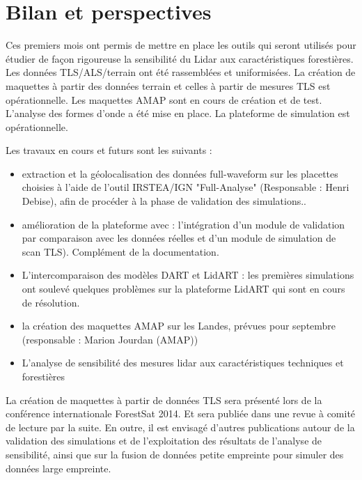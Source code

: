 \documentclass[a4paper,11pt]{article}
\begin{document}
\newpage

\section{Bilan et perspectives}
Ces premiers mois ont permis de mettre en place les outils qui seront utilisés pour étudier de façon rigoureuse la sensibilité du Lidar aux caractéristiques forestières. Les données TLS/ALS/terrain ont été rassemblées et uniformisées. La création de maquettes à partir des données terrain et celles à partir de mesures TLS est opérationnelle. Les maquettes AMAP sont en cours de création et de test. L'analyse des formes d'onde a été mise en place. La plateforme de simulation est opérationnelle.

\vspace{0.5cm}

Les travaux en cours et futurs sont les suivants :
\begin{itemize}
\item extraction et la géolocalisation des données full-waveform sur les placettes choisies à l'aide de l'outil IRSTEA/IGN "Full-Analyse" (Responsable : Henri Debise), afin de procéder à la phase de validation des simulations..
\item amélioration de la plateforme avec : l'intégration d'un module de validation par comparaison avec les données réelles et d'un module de simulation de scan TLS). Complément de la documentation.
\item L'intercomparaison des modèles DART et LidART : les premières simulations ont soulevé quelques problèmes sur la plateforme LidART qui sont en cours de résolution.
\item la création des maquettes AMAP sur les Landes, prévues pour septembre (responsable : Marion Jourdan (AMAP))
\item L'analyse de sensibilité des mesures lidar aux caractéristiques techniques et forestières
\end{itemize}

\vspace{0.8cm}

La création de maquettes  à partir de données TLS sera présenté lors de la conférence internationale ForestSat 2014. Et sera publiée dans une revue à comité de lecture par la suite. En outre, il est envisagé d'autres publications autour de la validation des simulations et de l'exploitation des résultats de l'analyse de sensibilité, ainsi que sur la fusion de données petite empreinte pour simuler des données large empreinte.
\end{document}
